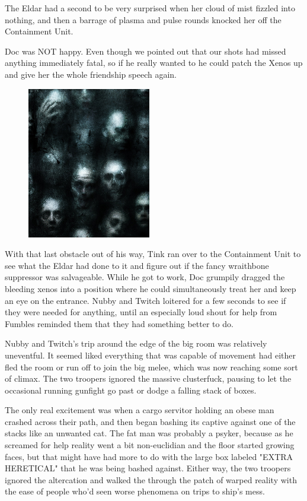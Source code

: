 The Eldar had a second to be very surprised when her cloud of mist fizzled into nothing, and then a barrage of plasma and pulse rounds knocked her off the Containment Unit. 


Doc was NOT happy. 
Even though we pointed out that our shots had missed anything immediately fatal, so if he really wanted to he could patch the Xenos up and give her the whole friendship speech again.

\begin{figure}
	\begin{center}
		\includegraphics[width=\figwidth]{pics/16/29.png}
	\end{center}
\end{figure}
With that last obstacle out of his way, Tink ran over to the Containment Unit to see what the Eldar had done to it and figure out if the fancy wraithbone suppressor was salvageable. 
While he got to work, Doc grumpily dragged the bleeding xenos into a position where he could simultaneously treat her and keep an eye on the entrance. 
Nubby and Twitch loitered for a few seconds to see if they were needed for anything, until an especially loud shout for help from Fumbles reminded them that they had something better to do.

Nubby and Twitch's trip around the edge of the big room was relatively uneventful. 
It seemed liked everything that was capable of movement had either fled the room or run off to join the big melee, which was now reaching some sort of climax. 
The two troopers ignored the massive clusterfuck, pausing to let the occasional running gunfight go past or dodge a falling stack of boxes. 


The only real excitement was when a cargo servitor holding an obese man crashed across their path, and then began bashing its captive against one of the stacks like an unwanted cat. 
The fat man was probably a psyker, because as he screamed for help reality went a bit non-euclidian and the floor started growing faces, but that might have had more to do with the large box labeled "EXTRA HERETICAL" that he was being bashed against. 
Either way, the two troopers ignored the altercation and walked the through the patch of warped reality with the ease of people who'd seen worse phenomena on trips to ship's mess.

